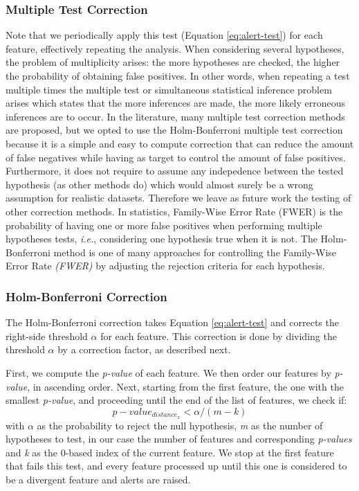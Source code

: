 \subsubsection*{Multiple Test Correction} \label{sec:multi-test}
Note that we periodically apply this test (Equation \ref{eq:alert-test}) for each feature, effectively repeating the analysis. When considering several hypotheses, the problem of multiplicity arises: the more hypotheses are checked, the higher the probability of obtaining false positives. In other words, when repeating a test multiple times the multiple test or simultaneous statistical inference problem \cite{MultiTestProblem-Pubmed}
\cite{MultiTestProblem-Dickhaus2014}
\cite{MultiTestProblem-Miller1966}  \cite{multiple-test-correction-geoffrey} arises which states that the more inferences are made, the more likely erroneous inferences are to occur. In the literature, many multiple test correction methods are proposed, but we opted to use the Holm-Bonferroni multiple test correction because it is a simple and easy to compute correction that can reduce the amount of false negatives while having as target to control the amount of false positives. Furthermore, it does not require to assume any indepedence between the tested hypothesis (as other methods do) which would almost surely be a wrong assumption for realistic datasets. Therefore we leave as future work the testing of other correction methods. In statistics, Family-Wise Error Rate (FWER) \cite{MultivariateMT} \cite{MultitestTamhane2018AdvancesIP} is the probability of having one or more false positives when performing multiple hypotheses tests, \textit{i.e.}, considering one hypothesis true when it is not. The Holm-Bonferroni method \cite{HolmBonferroni} is one of many approaches for controlling the Family-Wise Error Rate \textit{(FWER)} by adjusting the rejection criteria for each hypothesis.


\subsubsection*{Holm-Bonferroni Correction} \label{sec:holmbonferroni}
The Holm-Bonferroni correction takes Equation \ref{eq:alert-test} and corrects the right-side threshold $\alpha$ for each feature. This correction is done by dividing the threshold $\alpha$ by a correction factor, as described next.

First, we compute the \textit{p-value} of each feature. We then order our features by \textit{p-value}, in ascending order. Next, starting from the first feature, the one with the smallest \textit{p-value}, and proceeding until the end of the list of features, we check if:
\begin{equation}
    p-value_{distance_{x}} < \alpha / (m - k)
    \label{eq:corrected-pvalue}
\end{equation}
with $\alpha$ as the probability to reject the null hypothesis, \textit{m} as the number of hypotheses to test, in our case the number of features and corresponding \textit{p-values} and \textit{k} as the 0-based index of the current feature. We stop at the first feature that fails this test, and every feature processed up until this one is considered to be a divergent feature and alerts are raised.

